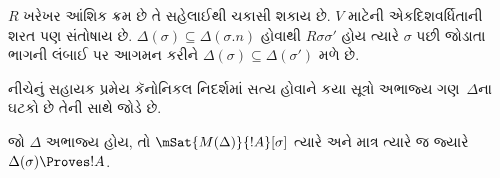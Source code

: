 $R$ ખરેખર આંશિક ક્રમ છે તે સહેલાઈથી ચકાસી શકાય છે.
$V$ માટેની એકદિશવર્ધિતાની શરત પણ સંતોષાય છે.
$\Delta(\sigma) \subseteq \Delta(\sigma.n)$ હોવાથી
$R\sigma\sigma'$ હોય ત્યારે $\sigma$ પછી જોડાતા ભાગની
લંબાઈ પર આગમન કરીને
$\Delta(\sigma) \subseteq \Delta(\sigma')$ મળે છે.
\endgroup

\begingroup
\makeatletter{}\makeatother


\label{guunit:OLP-0508}


નીચેનું સહાયક પ્રમેય કૅનોનિકલ નિદર્શમાં સત્ય હોવાને
કયા સૂત્રો અભાજ્ય ગણ~$\Delta$ના ઘટકો
છે તેની સાથે જોડે છે.

\begin{lem}
  જો $\Delta$ અભાજ્ય હોય, તો $\mSat{M(\Delta)}{!A}[\sigma]$
  ત્યારે અને માત્ર ત્યારે જ જ્યારે
  $\Delta(\sigma) \Proves !A$.
\end{lem}

